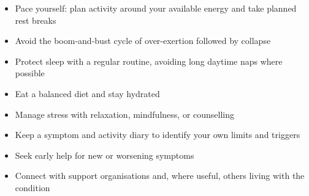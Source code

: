 \begin{itemize}
    \item Pace yourself: plan activity around your available energy and take planned rest breaks
    \item Avoid the boom-and-bust cycle of over-exertion followed by collapse
    \item Protect sleep with a regular routine, avoiding long daytime naps where possible
    \item Eat a balanced diet and stay hydrated
    \item Manage stress with relaxation, mindfulness, or counselling
    \item Keep a symptom and activity diary to identify your own limits and triggers
    \item Seek early help for new or worsening symptoms
    \item Connect with support organisations and, where useful, others living with the condition
\end{itemize}
